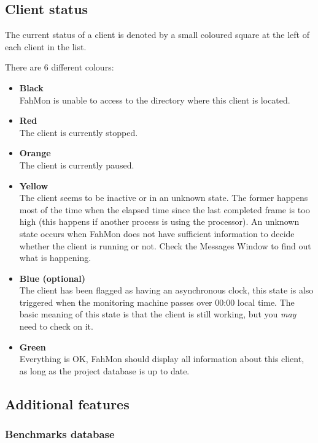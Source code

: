 \subsection{Client status}

The current status of a client is denoted by a small coloured square at the left
of each client in the list.

There are 6 different colours:
\begin{itemize}
 \item \textbf{Black}
  \\FahMon is unable to access to the directory where this client is located.
 \item \textbf{Red}
  \\The client is currently stopped.
 \item \textbf{Orange}
  \\The client is currently paused.
 \item \textbf{Yellow}
  \\The client seems to be inactive or in an unknown state. The former happens
   most of the time when the elapsed time since the last completed frame is too
   high (this happens if another process is using the processor). An unknown
   state occurs when FahMon does not have sufficient information to decide
   whether the client is running or not. Check the Messages Window to find out
   what is happening.
 \item \textbf{Blue (optional)}
  \\The client has been flagged as having an asynchronous clock, this state is
   also triggered when the monitoring machine passes over 00:00 local time. The
   basic meaning of this state is that the client is still working, but you
   \textit{may} need to check on it.
 \item \textbf{Green}
  \\Everything is OK, FahMon should display all information about this client,
   as long as the project database is up to date.
\end{itemize}

\subsection{Additional features}

\subsubsection{Benchmarks database}


